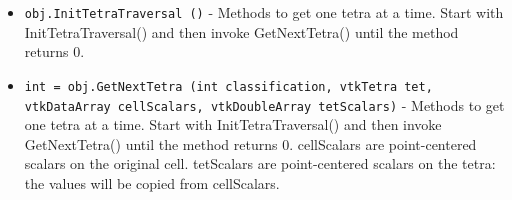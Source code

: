 \begin{itemize}
\item  \verb|obj.InitTetraTraversal ()| -  Methods to get one tetra at a time. Start with InitTetraTraversal()
 and then invoke GetNextTetra() until the method returns 0.

\item  \verb|int = obj.GetNextTetra (int classification, vtkTetra tet, vtkDataArray cellScalars, vtkDoubleArray tetScalars)| -  Methods to get one tetra at a time. Start with InitTetraTraversal()
 and then invoke GetNextTetra() until the method returns 0.
 cellScalars are point-centered scalars on the original cell.
 tetScalars are point-centered scalars on the tetra: the values will be
 copied from cellScalars.
 
 
 
 

\end{itemize}
